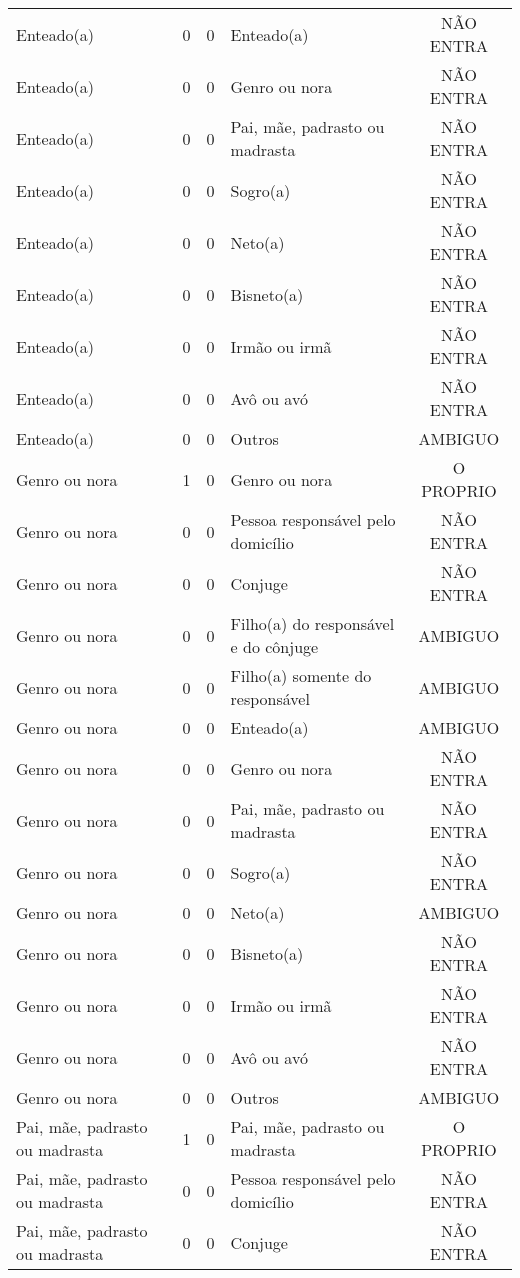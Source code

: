 \documentclass[
	12pt,				%
	openright,			%
	twoside,			%
	a4paper,			%
	english,			%
	french,				%
	spanish,			%
	brazil				%
	]{abntex2}
\begin{document}
\begin{anexosenv}
\begin{longtable}{@{}lcclc@{}}
				Enteado(a) & 0 & 0 & Enteado(a) & NÃO ENTRA \\
				Enteado(a) & 0 & 0 & Genro ou nora & NÃO ENTRA \\
				Enteado(a) & 0 & 0 & Pai, mãe, padrasto ou madrasta & NÃO ENTRA \\
				Enteado(a) & 0 & 0 & Sogro(a) & NÃO ENTRA \\
				Enteado(a) & 0 & 0 & Neto(a) & NÃO ENTRA \\
				Enteado(a) & 0 & 0 & Bisneto(a) & NÃO ENTRA \\
				Enteado(a) & 0 & 0 & Irmão ou irmã & NÃO ENTRA \\
				Enteado(a) & 0 & 0 & Avô ou avó & NÃO ENTRA \\
				Enteado(a) & 0 & 0 & Outros & AMBIGUO \\
				Genro ou nora & 1 & 0 & Genro ou nora & O PROPRIO \\
				Genro ou nora & 0 & 0 & Pessoa responsável pelo domicílio & NÃO ENTRA \\
				Genro ou nora & 0 & 0 & Conjuge & NÃO ENTRA \\
				Genro ou nora & 0 & 0 & Filho(a) do responsável e do cônjuge & AMBIGUO \\
				Genro ou nora & 0 & 0 & Filho(a) somente do responsável & AMBIGUO \\
				Genro ou nora & 0 & 0 & Enteado(a) & AMBIGUO \\
				Genro ou nora & 0 & 0 & Genro ou nora & NÃO ENTRA \\
				Genro ou nora & 0 & 0 & Pai, mãe, padrasto ou madrasta & NÃO ENTRA \\
				Genro ou nora & 0 & 0 & Sogro(a) & NÃO ENTRA \\
				Genro ou nora & 0 & 0 & Neto(a) & AMBIGUO \\
				Genro ou nora & 0 & 0 & Bisneto(a) & NÃO ENTRA \\
				Genro ou nora & 0 & 0 & Irmão ou irmã & NÃO ENTRA \\
				Genro ou nora & 0 & 0 & Avô ou avó & NÃO ENTRA \\
				Genro ou nora & 0 & 0 & Outros & AMBIGUO \\
				Pai, mãe, padrasto ou madrasta & 1 & 0 & Pai, mãe, padrasto ou madrasta & O PROPRIO \\
				Pai, mãe, padrasto ou madrasta & 0 & 0 & Pessoa responsável pelo domicílio & NÃO ENTRA \\
				Pai, mãe, padrasto ou madrasta & 0 & 0 & Conjuge & NÃO ENTRA \\

\end{longtable}
\end{anexosenv}
\end{document}
